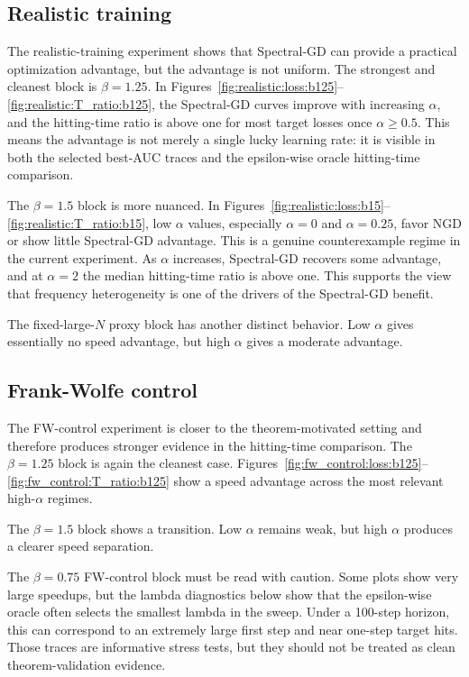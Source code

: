 \documentclass[11pt]{article}
\begin{document}
\subsection{Realistic training}

The realistic-training experiment shows that Spectral-GD can provide a practical optimization advantage, but the advantage is not uniform. The strongest and cleanest block is $\beta=1.25$. In Figures~\ref{fig:realistic:loss:b125}--\ref{fig:realistic:T_ratio:b125}, the Spectral-GD curves improve with increasing $\alpha$, and the hitting-time ratio is above one for most target losses once $\alpha\geq 0.5$. This means the advantage is not merely a single lucky learning rate: it is visible in both the selected best-AUC traces and the epsilon-wise oracle hitting-time comparison.

The $\beta=1.5$ block is more nuanced. In Figures~\ref{fig:realistic:loss:b15}--\ref{fig:realistic:T_ratio:b15}, low $\alpha$ values, especially $\alpha=0$ and $\alpha=0.25$, favor NGD or show little Spectral-GD advantage. This is a genuine counterexample regime in the current experiment. As $\alpha$ increases, Spectral-GD recovers some advantage, and at $\alpha=2$ the median hitting-time ratio is above one. This supports the view that frequency heterogeneity is one of the drivers of the Spectral-GD benefit.

The fixed-large-$N$ proxy block has another distinct behavior. Low $\alpha$ gives essentially no speed advantage, but high $\alpha$ gives a moderate advantage.

\subsection{Frank-Wolfe control}

The FW-control experiment is closer to the theorem-motivated setting and therefore produces stronger evidence in the hitting-time comparison. The $\beta=1.25$ block is again the cleanest case. Figures~\ref{fig:fw_control:loss:b125}--\ref{fig:fw_control:T_ratio:b125} show a speed advantage across the most relevant high-$\alpha$ regimes.

The $\beta=1.5$ block shows a transition. Low $\alpha$ remains weak, but high $\alpha$ produces a clearer speed separation.

The $\beta=0.75$ FW-control block must be read with caution. Some plots show very large speedups, but the lambda diagnostics below show that the epsilon-wise oracle often selects the smallest lambda in the sweep. Under a 100-step horizon, this can correspond to an extremely large first step and near one-step target hits. Those traces are informative stress tests, but they should not be treated as clean theorem-validation evidence.
\end{document}
